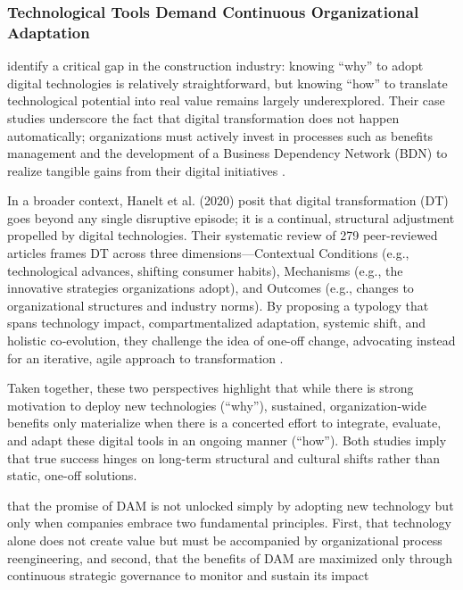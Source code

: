 \documentclass[a4paper,10pt,twocolumn]{article}
\numberwithin{figure}{section}
\numberwithin{table}{section}
\begin{document}
\vspace{0.3cm}
\subsubsection{Technological Tools Demand Continuous Organizational Adaptation}
\vspace{0.3cm}

\cite{LOVE2019102930} identify a critical gap in the construction industry: knowing “why” 
to adopt digital technologies is relatively straightforward, but knowing “how” to translate 
technological potential into real value remains largely underexplored. Their case studies underscore 
the fact that digital transformation does not happen automatically; organizations must actively
 invest in processes such as benefits management and the development of a Business Dependency 
 Network (BDN) to realize tangible gains from their digital initiatives \citep{LOVE2019102930}.

 In a broader context, Hanelt et al. (2020) posit that digital transformation (DT) goes beyond 
any single disruptive episode; it is a continual, structural adjustment propelled by digital 
technologies. Their systematic review of 279 peer-reviewed articles frames DT across three 
dimensions—Contextual Conditions (e.g., technological advances, shifting consumer habits), 
Mechanisms (e.g., the innovative strategies organizations adopt), and Outcomes 
(e.g., changes to organizational structures and industry norms). By proposing 
a typology that spans technology impact, compartmentalized adaptation, systemic 
shift, and holistic co‐evolution, they challenge the idea of one-off change, 
advocating instead for an iterative, agile approach to transformation \citep{Haneltarticle}.

Taken together, these two perspectives highlight that while there is strong motivation to 
deploy new technologies (“why”), sustained, organization-wide benefits only materialize 
when there is a concerted effort to integrate, evaluate, and adapt these digital tools 
in an ongoing manner (“how”). Both studies imply that true success hinges on long-term 
structural and cultural shifts rather than static, one-off solutions.

\vspace{0.3cm}

that the promise of DAM
is not unlocked simply by adopting new technology but only when companies embrace two 
fundamental principles. First, that technology alone does not create value but must be accompanied by 
organizational process reengineering, and second, that the benefits of DAM 
are maximized only through continuous strategic governance to monitor and sustain its impact 
\end{document}
